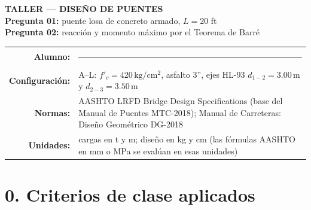 \documentclass[11pt,a4paper]{article}
\newcommand{\uKg}{\,\mathrm{kg/cm^2}}
\newcommand{\uM}{\,\mathrm{m}}
\begin{document}
\begin{center}
{\LARGE\bfseries\color{acento} TALLER --- DISEÑO DE PUENTES}\\[6pt]
{\large \textbf{Pregunta 01:} puente losa de concreto armado, $L = 20$ ft}\\[2pt]
{\large \textbf{Pregunta 02:} reacción y momento máximo por el Teorema de Barré}\\[10pt]
\begin{tabular}{>{\bfseries}r p{12.9cm}}
Alumno: & \rule{8cm}{0.4pt}\\
Configuración: & A--L: $f'_c = 420\uKg$, asfalto 3'', ejes HL-93 $d_{1-2} = 3.00\uM$ y $d_{2-3} = 3.50\uM$\\
Normas: & AASHTO LRFD Bridge Design Specifications (base del Manual de Puentes MTC-2018);
          Manual de Carreteras: Diseño Geométrico DG-2018\\
Unidades: & cargas en t y m; diseño en kg y cm (las fórmulas AASHTO en mm o MPa se evalúan en esas unidades)
\end{tabular}
\end{center}

\section*{0. Criterios de clase aplicados}
\end{document}
